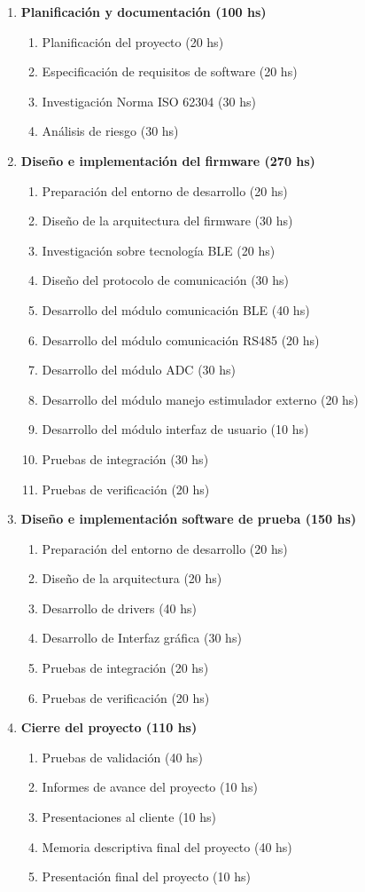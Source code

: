 \documentclass[
11pt, %
codirector, %
]{charter}
\begin{document}
\begin{enumerate}
\item \textbf{Planificación y documentación (100 hs)}
	\begin{enumerate}
	\item Planificación del proyecto (20 hs)
	\item Especificación de requisitos de software (20 hs)
	\item Investigación Norma ISO 62304 (30 hs)
	\item Análisis de riesgo (30 hs)
	\end{enumerate}
\item \textbf{Diseño e implementación del firmware (270 hs)}
	\begin{enumerate}
	\item Preparación del entorno de desarrollo (20 hs)
	\item Diseño de la arquitectura del firmware  (30 hs)
	\item Investigación sobre tecnología BLE (20 hs)	
	\item Diseño del protocolo de comunicación (30 hs)
	\item Desarrollo del módulo comunicación BLE (40 hs)
	\item Desarrollo del módulo comunicación RS485 (20 hs)
	\item Desarrollo del módulo ADC (30 hs)
	\item Desarrollo del módulo manejo estimulador externo (20 hs)
	\item Desarrollo del módulo interfaz de usuario (10 hs)
	\item Pruebas de integración (30 hs)
	\item Pruebas de verificación (20 hs)
	\end{enumerate}
\item \textbf{Diseño e implementación software de prueba (150 hs)}
	\begin{enumerate}
	\item Preparación del entorno de desarrollo (20 hs)
	\item Diseño de la arquitectura (20 hs)
	\item Desarrollo de drivers (40 hs)
	\item Desarrollo de Interfaz gráfica (30 hs)
	\item Pruebas de integración (20 hs)
	\item Pruebas de verificación (20 hs)
	\end{enumerate}
\item \textbf{Cierre del proyecto (110 hs)}
	\begin{enumerate}
	\item Pruebas de validación (40 hs)
	\item Informes de avance del proyecto (10 hs)
	\item Presentaciones al cliente (10 hs)
	\item Memoria descriptiva final del proyecto  (40 hs)
	\item Presentación final del proyecto (10 hs)
	\end{enumerate}
\end{enumerate}
\end{document}
